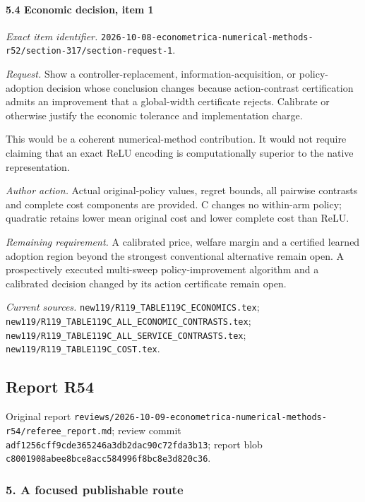 \paragraph{5.4 Economic decision, item 1}

\emph{Exact item identifier.} \nolinkurl{2026-10-08-econometrica-numerical-methods-r52/section-317/section-request-1}.

\par\emph{Request.} Show a controller-replacement, information-acquisition, or policy-adoption decision whose conclusion changes because action-contrast certification admits an improvement that a global-width certificate rejects. Calibrate or otherwise justify the economic tolerance and implementation charge.

This would be a coherent numerical-method contribution. It would not require claiming that an exact ReLU encoding is computationally superior to the native representation.

\par\emph{Author action.} Actual original-policy values, regret bounds, all pairwise contrasts and complete cost components are provided. C changes no within-arm policy; quadratic retains lower mean original cost and lower complete cost than ReLU.

\par\emph{Remaining requirement.} A calibrated price, welfare margin and a certified learned adoption region beyond the strongest conventional alternative remain open. A prospectively executed multi-sweep policy-improvement algorithm and a calibrated decision changed by its action certificate remain open.

\par\emph{Current sources.} \nolinkurl{new119/R119_TABLE119C_ECONOMICS.tex}; \nolinkurl{new119/R119_TABLE119C_ALL_ECONOMIC_CONTRASTS.tex}; \nolinkurl{new119/R119_TABLE119C_ALL_SERVICE_CONTRASTS.tex}; \nolinkurl{new119/R119_TABLE119C_COST.tex}.

\subsection{Report R54}

Original report \nolinkurl{reviews/2026-10-09-econometrica-numerical-methods-r54/referee_report.md}; review commit \nolinkurl{adf1256cff9cde365246a3db2dac90c72fda3b13}; report blob \nolinkurl{c8001908abee8bce8acc584996f8bc8e3d820c36}.

\subsubsection{5. A focused publishable route}

